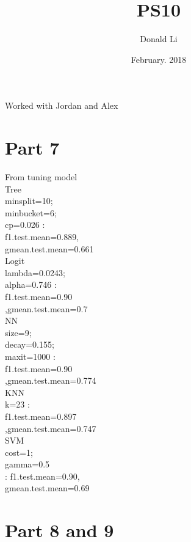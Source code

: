 \documentclass{article}
\title{PS10}
\author{Donald Li }
\date{February. 2018}
\begin{document}
\maketitle
Worked with Jordan and Alex
\section{Part 7}
From tuning model\\

Tree\\
minsplit=10;\\ 
minbucket=6; \\
cp=0.026 : \\
f1.test.mean=0.889,\\
gmean.test.mean=0.661\\


Logit \\
lambda=0.0243;\\
alpha=0.746 :\\
f1.test.mean=0.90\\
,gmean.test.mean=0.7\\



NN\\
size=9; \\
decay=0.155; \\
maxit=1000 :\\
f1.test.mean=0.90\\
,gmean.test.mean=0.774\\


KNN\\
 k=23 :\\
 f1.test.mean=0.897\\
 ,gmean.test.mean=0.747\\

 
 
 
SVM\\
cost=1; \\
gamma=0.5 \\
: f1.test.mean=0.90,\\
gmean.test.mean=0.69\\



\section{Part 8 and 9}
\end{document}
